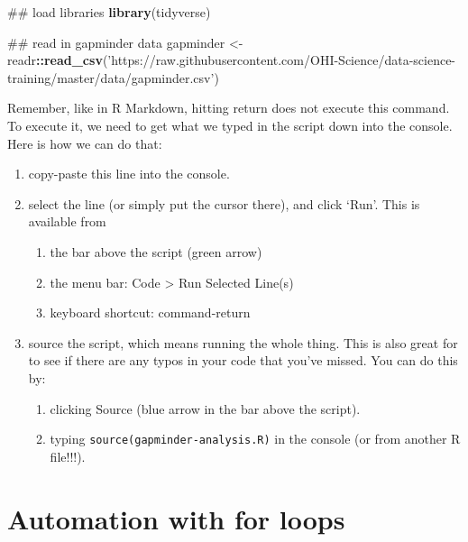 \documentclass[]{book}
\newenvironment{Shaded}{\begin{snugshade}}{\end{snugshade}}
\newcommand{\KeywordTok}[1]{\textcolor[rgb]{0.13,0.29,0.53}{\textbf{#1}}}
\newcommand{\StringTok}[1]{\textcolor[rgb]{0.31,0.60,0.02}{#1}}
\newcommand{\OperatorTok}[1]{\textcolor[rgb]{0.81,0.36,0.00}{\textbf{#1}}}
\newcommand{\NormalTok}[1]{#1}
\providecommand{\tightlist}{%
  \setlength{\itemsep}{0pt}\setlength{\parskip}{0pt}}
\theoremstyle{definition}
\theoremstyle{definition}
\theoremstyle{definition}
\theoremstyle{remark}
\begin{document}
\begin{Shaded}
\begin{Highlighting}[]
\NormalTok{## load libraries}
\KeywordTok{library}\NormalTok{(tidyverse)}

\NormalTok{## read in gapminder data}
\NormalTok{gapminder <-}\StringTok{ }\NormalTok{readr}\OperatorTok{::}\KeywordTok{read_csv}\NormalTok{(}\StringTok{'https://raw.githubusercontent.com/OHI-Science/data-science-training/master/data/gapminder.csv'}\NormalTok{)}
\end{Highlighting}
\end{Shaded}

Remember, like in R Markdown, hitting return does not execute this
command. To execute it, we need to get what we typed in the script down
into the console. Here is how we can do that:

\begin{enumerate}
\def\labelenumi{\arabic{enumi}.}
\tightlist
\item
  copy-paste this line into the console.
\item
  select the line (or simply put the cursor there), and click `Run'.
  This is available from

  \begin{enumerate}
  \def\labelenumii{\alph{enumii}.}
  \tightlist
  \item
    the bar above the script (green arrow)
  \item
    the menu bar: Code \textgreater{} Run Selected Line(s)
  \item
    keyboard shortcut: command-return
  \end{enumerate}
\item
  source the script, which means running the whole thing. This is also
  great for to see if there are any typos in your code that you've
  missed. You can do this by:

  \begin{enumerate}
  \def\labelenumii{\alph{enumii}.}
  \tightlist
  \item
    clicking Source (blue arrow in the bar above the script).
  \item
    typing
    \texttt{source(\textquotesingle{}gapminder-analysis.R\textquotesingle{})}
    in the console (or from another R file!!!).
  \end{enumerate}
\end{enumerate}

\section{Automation with for loops}\label{automation-with-for-loops}
\end{document}
